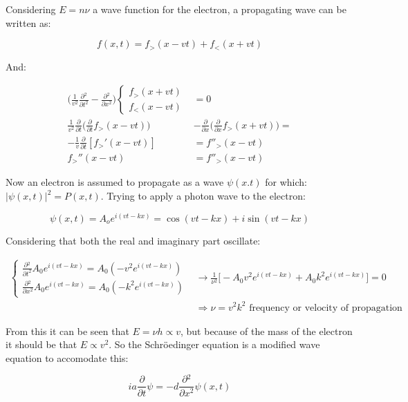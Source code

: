 \begin{enumerate}
Considering $E=n\nu$ a wave function for the electron, a propagating wave can be written as:

$$f(x,t) = f_>(x-vt)+f_<(x+vt)$$

And:

\begin{align*}
  \biggl(\frac{1}{v^2}\frac{\partial {^2}}{\partial {t^2}}-\frac{\partial {^2}}{\partial {x^2}}\biggr)\begin{cases}f_>(x+vt)\\f_<(x-vt)\end{cases} &= 0\\
  \frac{1}{v^2}\frac{\partial {}}{\partial {t}}\biggl(\frac{\partial {}}{\partial {t}}f_>(x-vt)\biggr)&-\frac{\partial {}}{\partial {x}}\biggl(\frac{\partial {}}{\partial {x}}f_>(x+vt)\biggr)=\\
  -\frac{1}{v}\frac{\partial {}}{\partial {t}}[f_>'(x-vt)]&=f''_>(x-vt)\\
  f_>''(x-vt) &=f''_>(x-vt)
\end{align*}

Now an electron is assumed to propagate as a wave $\psi(x.t)$ for which: $|\psi(x,t)|^2 = P(x,t)$.
Trying to apply a photon wave to the electron:

$$\psi(x,t) = A_oe^{i(vt-kx)} = \cos(vt-kx) + i\sin(vt - kx)$$

Considering that both the real and imaginary part oscillate:

\begin{align*}
  \begin{cases}\frac{\partial {^2}}{\partial {t^2}}A_0e^{i(vt-kx)} = A_0(-v^2e^{i(vt-kx)})\\\frac{\partial {^2}}{\partial {x^2}}A_0e^{i(vt-kx)} = A_0(-k^2e^{i(vt-kx)})\end{cases}&\rightarrow \frac{1}{\nu^2}\biggl[-A_0v^2e^{i(vt-kx)}+A_0k^2e^{i(vt-kx)}\biggr] = 0\\
                                                                                                                                                                                  &\Rightarrow \nu = v^2k^2\text{ frequency or velocity of propagation}
\end{align*}

From this it can be seen that $E=\nu h\propto v$, but because of the mass of the electron it should be that $E\propto v^2$.
So the Schr\"oedinger equation is a modified wave equation to accomodate this:

$$ia \frac{\partial {}}{\partial {t}}\psi=-d \frac{\partial {^2}}{\partial {x^2}}\psi(x,t)$$


\end{enumerate}
